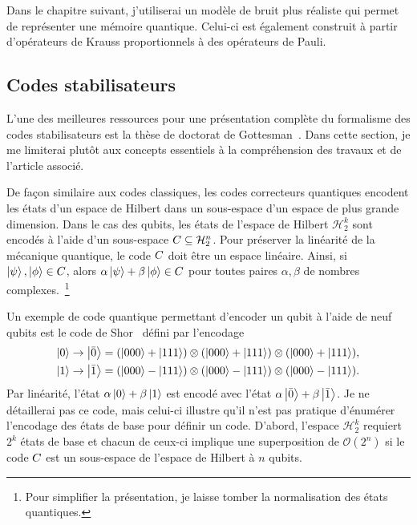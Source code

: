 Dans le chapitre suivant,
j'utiliserai un modèle de bruit plus réaliste qui permet
de représenter une mémoire quantique.
Celui-ci est également construit à partir d'opérateurs de Krauss proportionnels à des
opérateurs de Pauli.


\subsection{Codes stabilisateurs}

L'une des meilleures ressources pour une présentation complète du formalisme des codes
stabilisateurs est la thèse de doctorat de Gottesman~\cite{gottesman_stabilizer_1997}.
Dans cette section,
je me limiterai plutôt aux concepts essentiels à la compréhension des travaux 
et de l'article associé.

De façon similaire aux codes classiques,
les codes correcteurs quantiques encodent les états d'un espace de Hilbert
dans un sous-espace d'un espace de plus grande dimension.
Dans le cas des qubits,
les états de l'espace de Hilbert $\mathcal H_2^k$ sont encodés à l'aide d'un
sous-espace $C \subseteq \mathcal H_2^n$.
Pour préserver la linéarité de la mécanique quantique,
le code $C$ doit être un espace linéaire.
Ainsi,
si $\ket\psi, \ket\phi \in C$,
alors $\alpha\ket\psi + \beta\ket\phi \in C$ 
pour toutes paires $\alpha, \beta$ de nombres complexes.~\footnote{
  Pour simplifier la présentation,
  je laisse tomber la normalisation des états quantiques.
}

Un exemple de code quantique permettant d'encoder un qubit à l'aide de neuf qubits est 
le code de Shor~\cite{shor_scheme_1995} défini par l'encodage
\begin{align}
  \ket{0} \to \ket{\bar{0}} = (\ket{000} + \ket{111}) \otimes (\ket{000} + \ket{111}) \otimes (\ket{000} + \ket{111}), \notag \\
  \ket{1} \to \ket{\bar{1}} = (\ket{000} - \ket{111}) \otimes (\ket{000} - \ket{111}) \otimes (\ket{000} - \ket{111}).
  \label{eq:code_shor}
\end{align}
Par linéarité, l'état $\alpha \ket{0} + \beta \ket{1}$ est encodé avec l'état 
$\alpha \ket{\bar{0}} + \beta\ket{\bar {1}}$.
Je ne détaillerai pas ce code,
mais celui-ci illustre qu'il n'est pas pratique d'énumérer l'encodage des états de base
pour définir un code.
D'abord,
l'espace $\mathcal H_2^k$ requiert $2^k$ états de base
et chacun de ceux-ci implique une superposition de $\mathcal O(2^n)$ 
si le code $C$ est un sous-espace de l'espace de Hilbert à $n$ qubits.

